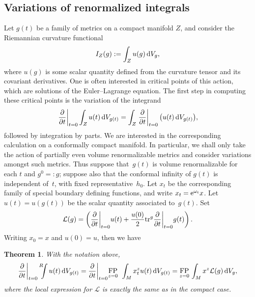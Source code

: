 \documentclass[pdftex]{sigma}
\numberwithin{equation}{section}
\newtheorem{Theorem}{Theorem}[section]
\newcommand{\del}{\partial}
\newcommand{\calL}{\mathcal L}
\newcommand{\gin}{{g^0}}
\newcommand{\tr}{\mathrm{tr}}
\newcommand{\FP}{\underset{z=0}{\operatorname{FP}}\,}
\newcommand{\Renint}{\mathop{\vphantom{T}}^R \! \! \! \int}
\begin{document}
\subsection{Variations of renormalized integrals}
Let $g(t)$ be a family of metrics on a compact manifold $Z$, and consider the Riemannian curvature functional
\begin{gather*}%
I_Z(g):=\int_Z u(g) \, {\rm d}V_g,
\end{gather*}
where $u(g)$ is some scalar quantity defined from the curvature tensor and its covariant derivatives. One is often interested in critical points of this action, which are solutions of the Euler--Lagrange equation. The first step in computing these critical points is the variation of the integrand
\begin{gather*}%
\left. \frac{\del }{\del t} \right|_{t=0}\int_Z u(t) \, {\rm d}V_{g(t)} = \int_Z \left. \frac{\del }{\del t} \right|_{t=0} \big(u(t) \, {\rm d}V_{g(t)}\big),
\end{gather*}
followed by integration by parts. We are interested in the corresponding calculation on a conformally compact manifold. In particular, we shall only take the action of partially even volume renormalizable metrics and consider variations amongst such metrics. Thus suppose that~$g(t)$ is volume renormalizable for each $t$ and $\gin=:g$; suppose also that the conformal infinity of $g(t)$ is independent of~$t$, with fixed representative~$h_0$. Let $x_t$ be the corresponding family of special boundary defining functions, and write $x_t = {\rm e}^{\omega_t} x$. Let $u(t)=u(g(t))$ be the scalar quantity associated to~$g(t)$. Set
\begin{gather*}%
{\cal L}(g) = \left(\frac{\partial}{\partial t} \bigg \vert_{t=0} u(t) + \frac{u(0)}{2} \tr^g \frac{\partial}{\partial t} \bigg \vert_{t=0} g(t)\right).
\end{gather*}
Writing $x_0 = x$ and $u(0) = u$, then we have

\begin{Theorem} \label{thm:renorm-curv-fcl}With the notation above,
\begin{gather*}%
\frac{\partial}{\partial t} \bigg \vert_{t=0} \Renint u(t) \, {\rm d}V_{g(t)} =
\frac{\partial}{\partial t} \bigg \vert_{t=0}\FP \; \int_M x_t^z u(t) \, {\rm d}V_{g(t)} = \FP \int_M x^z {\cal L}(g)\, {\rm d}V_{g} ,
\end{gather*}
where the local expression for $\calL$ is exactly the same as in the compact case.
\end{Theorem}
\end{document}
